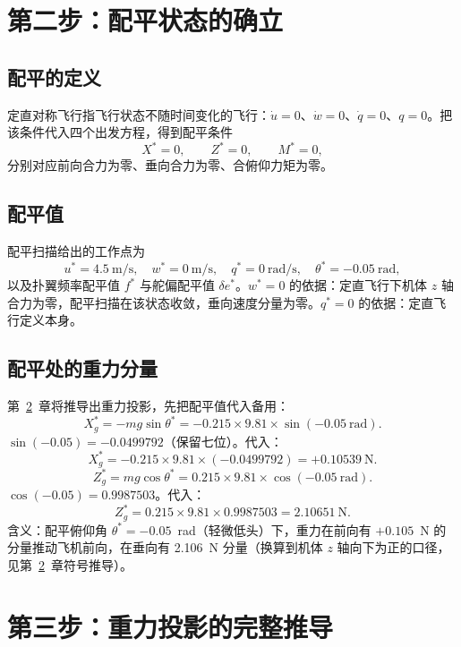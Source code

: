\documentclass[11pt,a4paper]{ctexart}
\newcommand{\ud}[1]{\dot{#1}}
\begin{document}
\section{第二步：配平状态的确立}\label{sec:trim}

\subsection{配平的定义}

定直对称飞行指飞行状态不随时间变化的飞行：$\ud u=0$、$\ud w=0$、$\ud q=0$、$q=0$。把该条件代入四个出发方程，得到配平条件
\begin{equation}\label{eq:2-1}
X^{*}=0,\qquad Z^{*}=0,\qquad M^{*}=0,
\tag{(2-1)}
\end{equation}
分别对应前向合力为零、垂向合力为零、合俯仰力矩为零。

\subsection{配平值}

配平扫描给出的工作点为
\[
u^{*}=4.5\ \mathrm{m/s},\quad w^{*}=0\ \mathrm{m/s},\quad q^{*}=0\ \mathrm{rad/s},\quad \theta^{*}=-0.05\ \mathrm{rad},
\]
以及扑翼频率配平值 $f^{*}$ 与舵偏配平值 $\delta e^{*}$。$w^{*}=0$ 的依据：定直飞行下机体 $z$ 轴合力为零，配平扫描在该状态收敛，垂向速度分量为零。$q^{*}=0$ 的依据：定直飞行定义本身。

\subsection{配平处的重力分量}

第~\ref{sec:gravity}~章将推导出重力投影，先把配平值代入备用：
\[
X_g^{*} = -m g\sin\theta^{*} = -0.215\times 9.81\times\sin(-0.05\ \mathrm{rad}).
\]
$\sin(-0.05)=-0.0499792$（保留七位）。代入：
\[
X_g^{*} = -0.215\times 9.81\times(-0.0499792) = +0.10539\ \mathrm{N}.
\]
\[
Z_g^{*} = m g\cos\theta^{*} = 0.215\times 9.81\times\cos(-0.05\ \mathrm{rad}).
\]
$\cos(-0.05)=0.9987503$。代入：
\[
Z_g^{*} = 0.215\times 9.81\times 0.9987503 = 2.10651\ \mathrm{N}.
\]
含义：配平俯仰角 $\theta^{*}=-0.05$~rad（轻微低头）下，重力在前向有 $+0.105$~N 的分量推动飞机前向，在垂向有 2.106~N 分量（换算到机体 $z$ 轴向下为正的口径，见第~\ref{sec:gravity}~章符号推导）。

\section{第三步：重力投影的完整推导}\label{sec:gravity}
\end{document}
